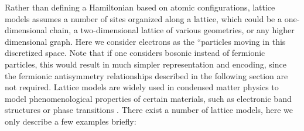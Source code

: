 Rather than defining a Hamiltonian based on atomic configurations, lattice models assumes a number of sites organized along a lattice, which could be a one-dimensional chain, a two-dimensional lattice of various geometries, or any higher dimensional graph. Here we consider electrons as the “particles moving in this discretized space. Note that if one considers bosonic instead of fermionic particles, this would result in much simpler representation and encoding, since the fermionic antisymmetry relationships described in the following section are not required. 
Lattice models are widely used in condensed matter physics to model phenomenological properties of certain materials, such as electronic band structures \cite{nemoshkalenko1998computational, Harrison2004, Marder2010} or phase transitions \cite{Vojta2003, Sachdev2009}. There exist a number of lattice models, here we only describe a few examples briefly: 
